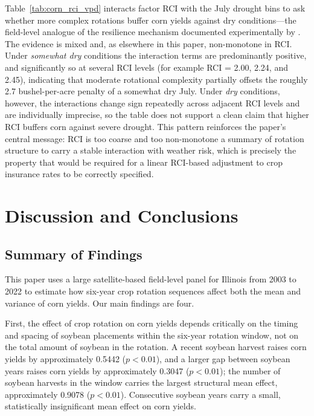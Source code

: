 \documentclass[12pt,letterpaper]{article}
\theoremstyle{remark}
\theoremstyle{remark}
\theoremstyle{plain}
\theoremstyle{definition}
\begin{document}
Table~\ref{tab:corn_rci_vpd} interacts factor RCI with the July drought bins to
ask whether more complex rotations buffer corn yields against dry conditions---the
field-level analogue of the resilience mechanism documented experimentally by
\citet{bowles2020}. The evidence is mixed and, as elsewhere in this paper,
non-monotone in RCI. Under \emph{somewhat dry} conditions the interaction terms
are predominantly positive, and significantly so at several RCI levels (for
example RCI = 2.00, 2.24, and 2.45), indicating that moderate rotational
complexity partially offsets the roughly 2.7 bushel-per-acre penalty of a
somewhat dry July. Under \emph{dry} conditions, however, the interactions change
sign repeatedly across adjacent RCI levels and are individually imprecise, so the
table does not support a clean claim that higher RCI buffers corn against severe
drought. This pattern reinforces the paper's central message: RCI is too coarse
and too non-monotone a summary of rotation structure to carry a stable
interaction with weather risk, which is precisely the property that would be
required for a linear RCI-based adjustment to crop insurance rates to be
correctly specified.

\section{\label{sec:conclusions}Discussion and Conclusions}

\subsection{\label{susec:summary}Summary of Findings}
 
This paper uses a large satellite-based field-level panel for Illinois from 2003 to 2022 to estimate how six-year crop rotation sequences affect both the mean and variance of corn yields. Our main findings are four.
 
First, the effect of crop rotation on corn yields depends critically on the timing and spacing of soybean placements within the six-year rotation window, not on the total amount of soybean in the rotation. A recent soybean harvest raises corn yields by approximately 0.5442 ($p<0.01$), and a larger gap between soybean years raises corn yields by approximately 0.3047 ($p<0.01$); the number of soybean harvests in the window carries the largest structural mean effect, approximately 0.9078 ($p<0.01$). Consecutive soybean years carry a small, statistically insignificant mean effect on corn yields.
\end{document}
